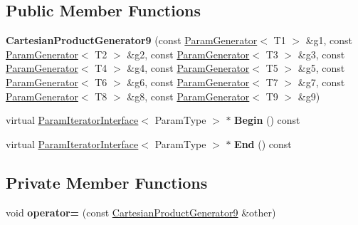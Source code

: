 \subsection*{Public Member Functions}
\begin{DoxyCompactItemize}
\item 
\mbox{\label{classtesting_1_1internal_1_1_cartesian_product_generator9_aff06c7992c06297c6bf5ad5eb56534e9}} 
{\bfseries Cartesian\+Product\+Generator9} (const \mbox{\hyperlink{classtesting_1_1internal_1_1_param_generator}{Param\+Generator}}$<$ T1 $>$ \&g1, const \mbox{\hyperlink{classtesting_1_1internal_1_1_param_generator}{Param\+Generator}}$<$ T2 $>$ \&g2, const \mbox{\hyperlink{classtesting_1_1internal_1_1_param_generator}{Param\+Generator}}$<$ T3 $>$ \&g3, const \mbox{\hyperlink{classtesting_1_1internal_1_1_param_generator}{Param\+Generator}}$<$ T4 $>$ \&g4, const \mbox{\hyperlink{classtesting_1_1internal_1_1_param_generator}{Param\+Generator}}$<$ T5 $>$ \&g5, const \mbox{\hyperlink{classtesting_1_1internal_1_1_param_generator}{Param\+Generator}}$<$ T6 $>$ \&g6, const \mbox{\hyperlink{classtesting_1_1internal_1_1_param_generator}{Param\+Generator}}$<$ T7 $>$ \&g7, const \mbox{\hyperlink{classtesting_1_1internal_1_1_param_generator}{Param\+Generator}}$<$ T8 $>$ \&g8, const \mbox{\hyperlink{classtesting_1_1internal_1_1_param_generator}{Param\+Generator}}$<$ T9 $>$ \&g9)
\item 
\mbox{\label{classtesting_1_1internal_1_1_cartesian_product_generator9_a5c6eab45aacb34bddfd8fa465ba5bd10}} 
virtual \mbox{\hyperlink{classtesting_1_1internal_1_1_param_iterator_interface}{Param\+Iterator\+Interface}}$<$ Param\+Type $>$ $\ast$ {\bfseries Begin} () const
\item 
\mbox{\label{classtesting_1_1internal_1_1_cartesian_product_generator9_a841e8fa34ff2f3483ab098340747b7b9}} 
virtual \mbox{\hyperlink{classtesting_1_1internal_1_1_param_iterator_interface}{Param\+Iterator\+Interface}}$<$ Param\+Type $>$ $\ast$ {\bfseries End} () const
\end{DoxyCompactItemize}
\subsection*{Private Member Functions}
\begin{DoxyCompactItemize}
\item 
\mbox{\label{classtesting_1_1internal_1_1_cartesian_product_generator9_a20622bd1e2b54fb0989224c6304dd5ec}} 
void {\bfseries operator=} (const \mbox{\hyperlink{classtesting_1_1internal_1_1_cartesian_product_generator9}{Cartesian\+Product\+Generator9}} \&other)
\end{DoxyCompactItemize}
